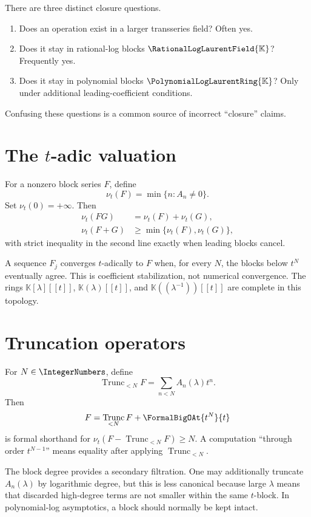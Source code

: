 \documentclass[11pt,openany]{book}
\theoremstyle{definition}
\theoremstyle{plain}
\theoremstyle{remark}
\newcommand{\K}{\mathbb{K}}
\newcommand{\Plog}{\PolynomialLogLaurentRing{\K}}
\newcommand{\Rlog}{\RationalLogLaurentField{\K}}
\newcommand{\val}{\nu}
\DeclareMathOperator{\trunc}{Trunc}
\begin{document}
\begin{checkpointbox}
There are three distinct closure questions.
\begin{enumerate}
\item Does an operation exist in a larger transseries field? Often yes.
\item Does it stay in rational-log blocks \(\Rlog\)? Frequently yes.
\item Does it stay in polynomial blocks \(\Plog\)? Only under additional leading-coefficient conditions.
\end{enumerate}
Confusing these questions is a common source of incorrect ``closure'' claims.
\end{checkpointbox}

\section{The \texorpdfstring{\(t\)}{t}-adic valuation}
For a nonzero block series \(F\), define
\begin{equation}\label{eq:t-valuation}
 \val_t(F)=\min\{n:A_n\ne0\}.
\end{equation}
Set \(\val_t(0)=+\infty\). Then
\begin{align*}
 \val_t(FG)&=\val_t(F)+\val_t(G),\\
 \val_t(F+G)&\ge\min\{\val_t(F),\val_t(G)\},
\end{align*}
with strict inequality in the second line exactly when leading blocks cancel.

A sequence \(F_j\) converges \(t\)-adically to \(F\) when, for every \(N\), the blocks below \(t^N\) eventually agree. This is coefficient stabilization, not numerical convergence. The rings \(\K[\lambda][[t]]\), \(\K(\lambda)[[t]]\), and \(\K((\lambda^{-1}))[[t]]\) are complete in this topology.

\section{Truncation operators}
For \(N\in\IntegerNumbers\), define
\begin{equation}\label{eq:trunc}
 \trunc_{<N}F=\sum_{n<N}A_n(\lambda)t^n.
\end{equation}
Then
\[
 F=\trunc_{<N}F+\FormalBigOAt{t^N}{t}
\]
is formal shorthand for \(\val_t(F-\trunc_{<N}F)\ge N\). A computation ``through order \(t^{N-1}\)'' means equality after applying \(\trunc_{<N}\).

The block degree provides a secondary filtration. One may additionally truncate \(A_n(\lambda)\) by logarithmic degree, but this is less canonical because large \(\lambda\) means that discarded high-degree terms are not smaller within the same \(t\)-block. In polynomial-log asymptotics, a block should normally be kept intact.
\end{document}
